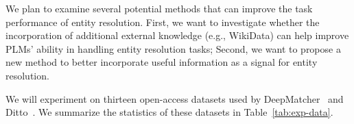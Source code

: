 We plan to examine several potential methods that can improve the task performance of entity resolution. 
First, we want to investigate whether the incorporation of additional external knowledge (e.g., WikiData) can help improve PLMs' ability in handling entity resolution tasks; Second, we want to propose a new method to better incorporate useful information as a signal for entity resolution.

We will experiment on thirteen open-access datasets used by DeepMatcher~\cite{mudgal_deep_2018} and Ditto~\cite{li_deep_2020}. We summarize the statistics of these datasets in Table~\ref{tab:exp-data}.


\begin{table}[h]
\centering
{}
\end{table}
